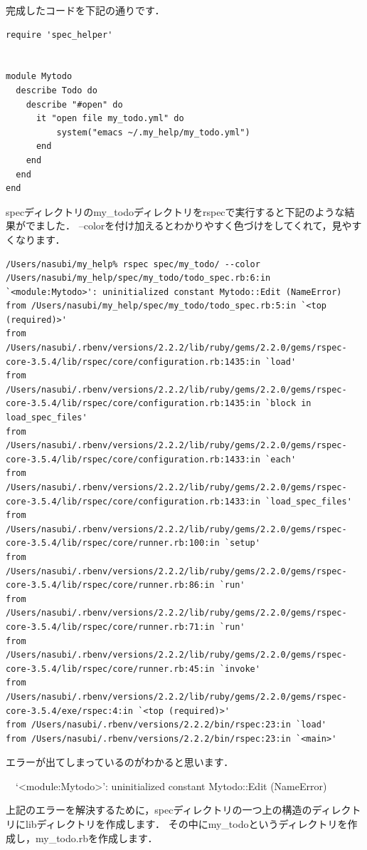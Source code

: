 完成したコードを下記の通りです．
\begin{lstlisting}[style=customRuby]
require 'spec_helper'


module Mytodo
  describe Todo do
    describe "#open" do
      it "open file my_todo.yml" do
          system("emacs ~/.my_help/my_todo.yml")
      end
    end
  end
end

\end{lstlisting}
specディレクトリのmy\_todoディレクトリをrspecで実行すると下記のような結果がでました．
--colorを付け加えるとわかりやすく色づけをしてくれて，見やすくなります．
\begin{lstlisting}[style=customCsh]
/Users/nasubi/my_help% rspec spec/my_todo/ --color
/Users/nasubi/my_help/spec/my_todo/todo_spec.rb:6:in `<module:Mytodo>': uninitialized constant Mytodo::Edit (NameError)
from /Users/nasubi/my_help/spec/my_todo/todo_spec.rb:5:in `<top (required)>'
from /Users/nasubi/.rbenv/versions/2.2.2/lib/ruby/gems/2.2.0/gems/rspec-core-3.5.4/lib/rspec/core/configuration.rb:1435:in `load'
from /Users/nasubi/.rbenv/versions/2.2.2/lib/ruby/gems/2.2.0/gems/rspec-core-3.5.4/lib/rspec/core/configuration.rb:1435:in `block in load_spec_files'
from /Users/nasubi/.rbenv/versions/2.2.2/lib/ruby/gems/2.2.0/gems/rspec-core-3.5.4/lib/rspec/core/configuration.rb:1433:in `each'
from /Users/nasubi/.rbenv/versions/2.2.2/lib/ruby/gems/2.2.0/gems/rspec-core-3.5.4/lib/rspec/core/configuration.rb:1433:in `load_spec_files'
from /Users/nasubi/.rbenv/versions/2.2.2/lib/ruby/gems/2.2.0/gems/rspec-core-3.5.4/lib/rspec/core/runner.rb:100:in `setup'
from /Users/nasubi/.rbenv/versions/2.2.2/lib/ruby/gems/2.2.0/gems/rspec-core-3.5.4/lib/rspec/core/runner.rb:86:in `run'
from /Users/nasubi/.rbenv/versions/2.2.2/lib/ruby/gems/2.2.0/gems/rspec-core-3.5.4/lib/rspec/core/runner.rb:71:in `run'
from /Users/nasubi/.rbenv/versions/2.2.2/lib/ruby/gems/2.2.0/gems/rspec-core-3.5.4/lib/rspec/core/runner.rb:45:in `invoke'
from /Users/nasubi/.rbenv/versions/2.2.2/lib/ruby/gems/2.2.0/gems/rspec-core-3.5.4/exe/rspec:4:in `<top (required)>'
from /Users/nasubi/.rbenv/versions/2.2.2/bin/rspec:23:in `load'
from /Users/nasubi/.rbenv/versions/2.2.2/bin/rspec:23:in `<main>'
\end{lstlisting}
エラーが出てしまっているのがわかると思います．

　`<module:Mytodo>': uninitialized constant Mytodo::Edit (NameError)

上記のエラーを解決するために，specディレクトリの一つ上の構造のディレクトリにlibディレクトリを作成します．
その中にmy\_todoというディレクトリを作成し，my\_todo.rbを作成します．

